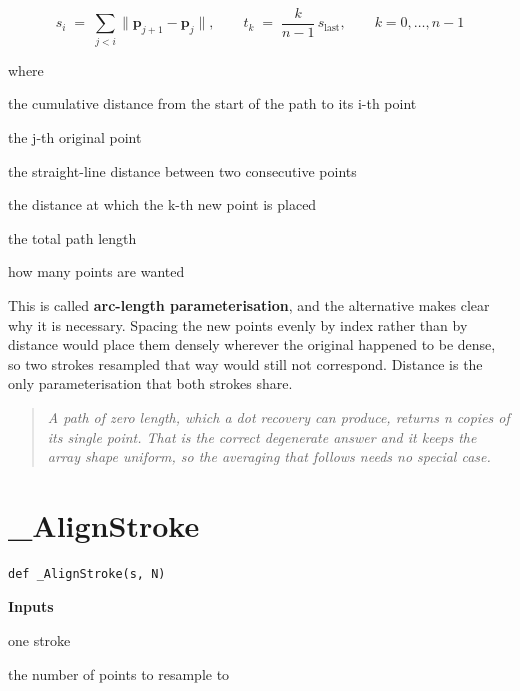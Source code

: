 \begin{equation}
s_i \;=\; \sum_{j<i} \big\| \mathbf{p}_{j+1} - \mathbf{p}_{j} \big\|, \qquad t_k \;=\; \frac{k}{n-1}\, s_{\mathrm{last}}, \qquad k = 0, \dots, n-1
\end{equation}

\noindent where
\begin{description}[leftmargin=2.4em,style=nextline,font=\normalfont\ttfamily]\setlength\itemsep{1pt}
  \item[{$s_i$}] \normalfont the cumulative distance from the start of the path to its i-th point
  \item[{$\mathbf{p}_j$}] \normalfont the j-th original point
  \item[{$\|\cdot\|$}] \normalfont the straight-line distance between two consecutive points
  \item[{$t_k$}] \normalfont the distance at which the k-th new point is placed
  \item[{$s_{\mathrm{last}}$}] \normalfont the total path length
  \item[{$n$}] \normalfont how many points are wanted
\end{description}
This is called \textbf{arc-length parameterisation}, and the alternative makes clear why it is necessary. Spacing the new points evenly by index rather than by distance would place them densely wherever the original happened to be dense, so two strokes resampled that way would still not correspond. Distance is the only parameterisation that both strokes share.


\begin{quote}\small\itshape A path of zero length, which a dot recovery can produce, returns n copies of its single point. That is the correct degenerate answer and it keeps the array shape uniform, so the averaging that follows needs no special case.\end{quote}

\section{\_AlignStroke}
\begin{lstlisting}[style=sig]
def _AlignStroke(s, N)
\end{lstlisting}

\noindent\textbf{Inputs}
\begin{description}[leftmargin=2.2em,style=nextline,font=\normalfont\ttfamily]\setlength\itemsep{1pt}
  \item[{s}] \normalfont one stroke
  \item[{N}] \normalfont the number of points to resample to
\end{description}

